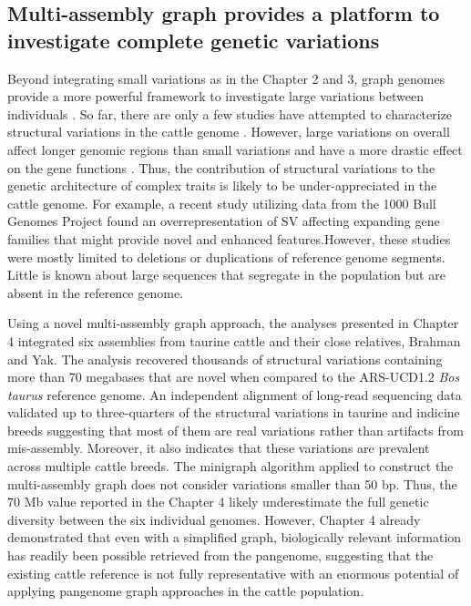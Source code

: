 \documentclass[../main.tex]{subfiles}
\begin{document}
\subsection*{Multi-assembly graph provides a platform to investigate complete genetic variations }

Beyond integrating small variations as in the Chapter 2 and 3, graph genomes provide a more powerful framework to investigate large variations between individuals \citep{eggertsson2019graphtyper2,chen2019paragraph,siren2020genotyping}. So far, there are only a few studies have attempted to characterize structural variations in the cattle genome \citep{liu2010analysis,bickhart2012copy,boussaha2015genome,chen2017detection,Hu2020}. However, large variations on overall affect longer genomic regions than small variations and have a more drastic effect on the gene functions \citep{chiang2017impact,scott2021structural}. Thus, the contribution of structural variations to the genetic architecture of complex traits is likely to be under-appreciated in the cattle genome.
For example, a recent study utilizing data from the 1000 Bull Genomes Project \citep{chen2017detection} found an overrepresentation of SV affecting expanding gene families that might provide novel and enhanced features.However, these studies were mostly limited to deletions or duplications of reference genome segments. Little is known about large sequences that segregate in the population but are absent in the reference genome. 


Using a novel multi-assembly graph approach, the analyses presented in Chapter 4 integrated six assemblies from taurine cattle and their close relatives, Brahman and Yak. The analysis recovered thousands of structural variations containing more than 70 megabases that are novel when compared to the ARS-UCD1.2 \emph{Bos taurus} reference genome. An independent alignment of long-read sequencing data validated up to three-quarters of the structural variations in taurine and indicine breeds suggesting that most of them are real variations rather than artifacts from mis-assembly.  Moreover, it also indicates that these variations are prevalent across multiple cattle breeds. The minigraph algorithm applied to construct the multi-assembly graph does not consider variations smaller than 50 bp. Thus, the 70 Mb value reported in the Chapter 4 likely underestimate the full genetic diversity between the six individual genomes. However, Chapter 4 already demonstrated that even with a simplified graph, biologically relevant information has readily been possible retrieved from the pangenome, suggesting that the existing cattle reference is not fully representative with an enormous potential of applying pangenome graph approaches in the cattle population. 
\end{document}

